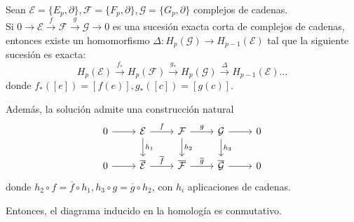 \begin{theorem}
  Sean $\mathcal{E} = \{E_p, \partial\}, \mathcal{F} = \{F_p, \partial\}, \mathcal{G} = \{G_p, \partial\}$ complejos de cadenas. \\
  Si $0 \to \mathcal{E} \xrightarrow{f} \mathcal{F} \xrightarrow{g} \mathcal{G} \to 0$ es una sucesión exacta corta de complejos
  de cadenas, entonces existe un homomorfismo $\Delta \colon H_p(\mathcal{G}) \to H_{p-1}(\mathcal{E})$ tal que la siguiente
  sucesión es exacta:
  \[ H_p(\mathcal{E}) \xrightarrow{f_*} H_p(\mathcal{F}) \xrightarrow{g_*} H_p(\mathcal{G}) \xrightarrow{\Delta} H_{p-1}(\mathcal{E}) \dots \]
  donde $f_*([e]) = [f(e)], g_*([c]) = [g(c)]$.

  Además, la solución admite una construcción natural
  \[ \begin{tikzcd}
    0 \arrow{r} & \mathcal{E} \arrow{r}{f} \arrow{d}{h_1} & \mathcal{F} \arrow{r}{g} \arrow{d}{h_2} & \mathcal{G} \arrow{r} \arrow{d}{h_3} & 0 \\
    0 \arrow{r} & \overline{\mathcal{E}} \arrow{r}{\overline{f}} & \overline{\mathcal{F}} \arrow{r}{\overline{g}} & \overline{\mathcal{G}} \arrow{r} & 0
  \end{tikzcd} \]
  donde $h_2 \circ f = \overline{f} \circ h_1, h_3 \circ g = \overline{g} \circ h_2$, con $h_i$ aplicaciones de cadenas.

  Entonces, el diagrama inducido en la homología es conmutativo.
\end{theorem}
